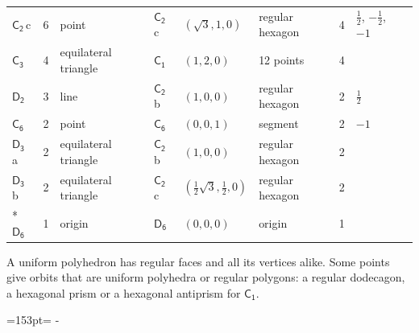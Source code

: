 \documentclass[10pt,a4paper]{article}
\newcommand{\needspace}[1]{\par\penalty-100\begingroup\dimen0=#1\relax\dimen2=\pagegoal
  \advance\dimen2-\pagetotal\ifdim\dimen0>\dimen2\relax\ifdim\dimen2>0pt\vfil\break\fi\fi
  \endgroup}
\numberwithin{equation}{section}
\newcommand{\grp}[1]{\mathsf{#1}}
\newcommand{\clsletter}[1]{\,{\scriptsize\color{black!55}#1}}
\newlength{\fillwidth}\newlength{\cellwidth}\newlength{\colwidth}
\begin{document}
{{\begin{longtable}{@{}lrllllr>{\RaggedRight\arraybackslash}p{\fillwidth}r@{}}
\href{C2.pdf}{$\grp{C_{2}}$}\clsletter{c} & 6 & point & \href{C2.pdf}{$\grp{C_{2}}$}\clsletter{c} & $(\sqrt{3}, 1, 0)$ & regular hexagon & 4 & ${\tfrac{1}{2}}$, ${-\tfrac{1}{2}}$, ${-1}$ & \\
\href{C3.pdf}{$\grp{C_{3}}$} & 4 & equilateral triangle & \href{C1.pdf}{$\grp{C_{1}}$} & $(1, 2, 0)$ & 12 points & 4 &  & \\
\href{D2.pdf}{$\grp{D_{2}}$} & 3 & line & \href{C2.pdf}{$\grp{C_{2}}$}\clsletter{b} & $(1, 0, 0)$ & regular hexagon & 2 & ${\tfrac{1}{2}}$ & \\
\href{C6.pdf}{$\grp{C_{6}}$} & 2 & point & \href{C6.pdf}{$\grp{C_{6}}$} & $(0, 0, 1)$ & segment & 2 & ${-1}$ & \\
\href{D3.pdf}{$\grp{D_{3}}$}\clsletter{a} & 2 & equilateral triangle & \href{C2.pdf}{$\grp{C_{2}}$}\clsletter{b} & $(1, 0, 0)$ & regular hexagon & 2 &  & \\
\href{D3.pdf}{$\grp{D_{3}}$}\clsletter{b} & 2 & equilateral triangle & \href{C2.pdf}{$\grp{C_{2}}$}\clsletter{c} & $(\tfrac{1}{2}\sqrt{3}, \tfrac{1}{2}, 0)$ & regular hexagon & 2 &  & \\*
\href{D6.pdf}{$\grp{D_{6}}$} & 1 & origin & \href{D6.pdf}{$\grp{D_{6}}$} & $(0, 0, 0)$ & origin & 1 &  & \\
\bottomrule\end{longtable}}}
A uniform polyhedron has regular faces and all its vertices alike. Some points give orbits that are uniform polyhedra or regular polygons: a regular dodecagon, a hexagonal prism or a hexagonal antiprism for \href{C1.pdf}{$\grp{C_{1}}$}.
\needspace{153pt}
\end{document}
